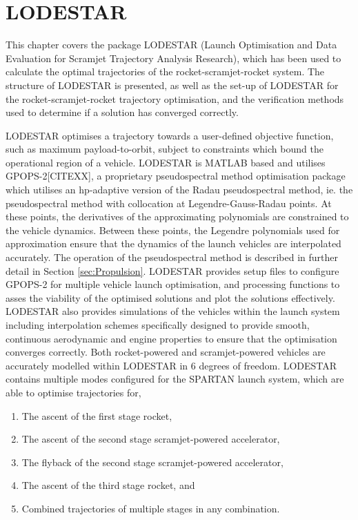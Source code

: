 
\cleardoublepage
\chapter{LODESTAR}\label{chapter:LODESTAR}	
This chapter covers the package LODESTAR (Launch Optimisation and Data Evaluation for Scramjet Trajectory Analysis Research), which has been used to calculate the optimal trajectories of the rocket-scramjet-rocket system. The structure of LODESTAR is presented, as well as the set-up of LODESTAR for the rocket-scramjet-rocket trajectory optimisation, and the verification methods used to determine if a solution has converged correctly.

LODESTAR optimises a trajectory towards a user-defined objective function, such as maximum payload-to-orbit, subject to constraints which bound the operational region of a vehicle.
LODESTAR is MATLAB based and utilises GPOPS-2[CITEXX], a proprietary pseudospectral method optimisation package which utilises an hp-adaptive version of the Radau pseudospectral method, ie. the pseudospectral method with collocation at Legendre-Gauss-Radau points. At these points, the derivatives of the approximating polynomials are constrained to the vehicle dynamics. Between these points, the Legendre polynomials used for approximation ensure that the dynamics of the launch vehicles are interpolated accurately. The operation of the pseudospectral method is described in further detail in Section \ref{sec:Propulsion}.
LODESTAR provides setup files to configure GPOPS-2 for multiple vehicle launch optimisation, and processing functions to asses the viability of the optimised solutions and plot the solutions effectively. 
LODESTAR also provides simulations of the vehicles within the launch system including interpolation schemes specifically designed to provide smooth, continuous aerodynamic and engine properties to ensure that the optimisation converges correctly. 
 Both rocket-powered and scramjet-powered vehicles are accurately modelled within LODESTAR in 6 degrees of freedom. LODESTAR contains multiple modes configured for the SPARTAN launch system, which are able to optimise trajectories for,
\begin{enumerate}
	\item The ascent of the first stage rocket,
	\item The ascent of the second stage scramjet-powered accelerator,
	\item The flyback of the second stage scramjet-powered accelerator,
	\item The ascent of the third stage rocket, and
	\item Combined trajectories of multiple stages in any combination.
\end{enumerate}
 
